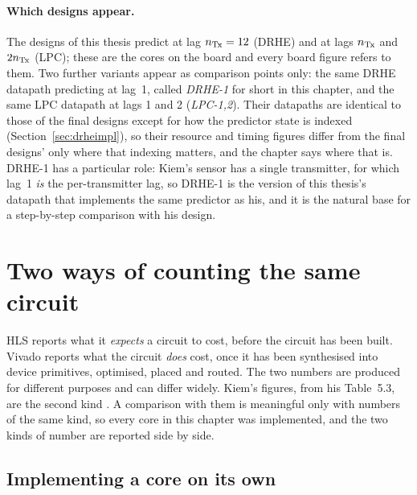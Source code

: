 \paragraph{Which designs appear.} The designs of this thesis predict at lag
$n_{\mathrm{Tx}} = 12$ (DRHE) and at lags $n_{\mathrm{Tx}}$ and $2n_{\mathrm{Tx}}$ (LPC); these are the cores on
the board and every board figure refers to them. Two further variants appear
as comparison points only: the same DRHE datapath predicting at lag~1, called
\emph{DRHE-1} for short in this chapter, and the same LPC datapath at lags 1
and 2 (\emph{LPC-1,2}). Their datapaths are identical to those of the final
designs except for how the predictor state is indexed
(Section~\ref{sec:drheimpl}), so their resource and timing figures differ from
the final designs' only where that indexing matters, and the chapter says where
that is. DRHE-1 has a particular role: Kiem's sensor has a single transmitter,
for which lag~1 \emph{is} the per-transmitter lag, so DRHE-1 is the version of
this thesis's datapath that implements the same predictor as his, and it is the
natural base for a step-by-step comparison with his design.

\section{Two ways of counting the same circuit}
\label{sec:hw_counting}

HLS reports what it \emph{expects} a circuit to cost, before the circuit has
been built. Vivado reports what the circuit \emph{does} cost, once it has been
synthesised into device primitives, optimised, placed and routed. The two
numbers are produced for different purposes and can differ widely. Kiem's
figures, from his Table~5.3, are the second kind
\cite{kiem2025}. A comparison with them is meaningful only with numbers of the
same kind, so every core in this chapter was implemented, and the two kinds of
number are reported side by side.

\subsection{Implementing a core on its own}

